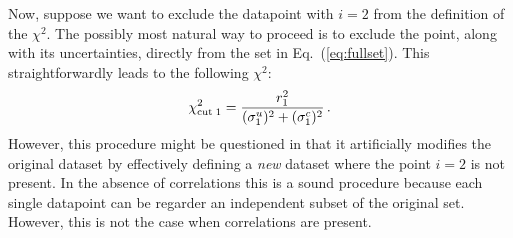 \documentclass[10pt,a4paper]{article}
\begin{document}
Now, suppose we want to exclude the datapoint with $i=2$ from the
definition of the $\chi^2$. The possibly most natural way to proceed
is to exclude the point, along with its uncertainties, directly from
the set in Eq.~(\ref{eq:fullset}). This straightforwardly leads to the
following $\chi^2$:
\begin{equation}\label{eq:redchi21}
{\chi}_{\rm cut\;1}^2 = \frac{r_1^2}{(\sigma_1^u)^2+ (\sigma_1^c)^2}\,.
\end{equation}
However, this procedure might be questioned in that it artificially
modifies the original dataset by effectively defining a \textit{new}
dataset where the point $i=2$ is not present. In the absence of
correlations this is a sound procedure because each single datapoint
can be regarder an independent subset of the original
set. However, this is not the case when correlations are present.
\end{document}
